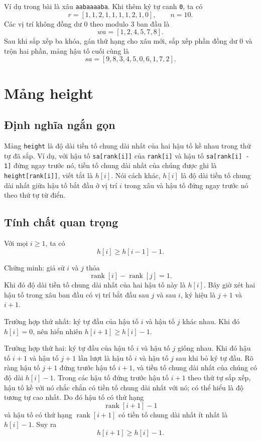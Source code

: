 \documentclass[11pt]{article}
\begin{document}
Ví dụ trong bài là xâu \texttt{aabaaaaba}. Khi thêm ký tự canh \texttt{0}, ta
có
\[
  r=[1,1,2,1,1,1,1,2,1,0],\qquad n=10.
\]
Các vị trí không đồng dư $0$ theo modulo $3$ ban đầu là
\[
  wa=[1,2,4,5,7,8].
\]
Sau khi sắp xếp ba khóa, gán thứ hạng cho xâu mới, sắp xếp phần đồng dư $0$
và trộn hai phần, mảng hậu tố cuối cùng là
\[
  sa=[9,8,3,4,5,0,6,1,7,2].
\]

\section{Mảng height}

\subsection*{Định nghĩa ngắn gọn}

Mảng \texttt{height} là độ dài tiền tố chung dài nhất của hai hậu tố kề nhau
trong thứ tự đã sắp. Ví dụ, với hậu tố \texttt{sa[rank[i]]} của
\texttt{rank[i]} và hậu tố \texttt{sa[rank[i] - 1]} đứng ngay trước nó, tiền
tố chung dài nhất của chúng được ghi là \texttt{height[rank[i]]}, viết tắt là
$h[i]$. Nói cách khác, $h[i]$ là độ dài tiền tố chung dài nhất giữa hậu tố bắt
đầu ở vị trí $i$ trong xâu và hậu tố đứng ngay trước nó theo thứ tự từ điển.

\subsection*{Tính chất quan trọng}

Với mọi $i\ge 1$, ta có
\[
  h[i]\ge h[i-1]-1.
\]

Chứng minh: giả sử $i$ và $j$ thỏa
\[
  \operatorname{rank}[i]-\operatorname{rank}[j]=1.
\]
Khi đó độ dài tiền tố chung dài nhất của hai hậu tố này là $h[i]$. Bây giờ xét
hai hậu tố trong xâu ban đầu có vị trí bắt đầu sau $j$ và sau $i$, ký hiệu là
$j+1$ và $i+1$.

Trường hợp thứ nhất: ký tự đầu của hậu tố $i$ và hậu tố $j$ khác nhau. Khi đó
$h[i]=0$, nên hiển nhiên $h[i+1]\ge h[i]-1$.

Trường hợp thứ hai: ký tự đầu của hậu tố $i$ và hậu tố $j$ giống nhau. Khi đó
hậu tố $i+1$ và hậu tố $j+1$ lần lượt là hậu tố $i$ và hậu tố $j$ sau khi bỏ
ký tự đầu. Rõ ràng hậu tố $j+1$ đứng trước hậu tố $i+1$, và tiền tố chung dài
nhất của chúng có độ dài $h[i]-1$. Trong các hậu tố đứng trước hậu tố $i+1$
theo thứ tự sắp xếp, hậu tố kề với nó chắc chắn có tiền tố chung dài nhất với
nó; có thể hiểu là độ tương tự cao nhất. Do đó hậu tố có thứ hạng
\[
  \operatorname{rank}[i+1]-1
\]
và hậu tố có thứ hạng $\operatorname{rank}[i+1]$ có tiền tố chung dài nhất ít
nhất là $h[i]-1$. Suy ra
\[
  h[i+1]\ge h[i]-1.
\]
\end{document}

